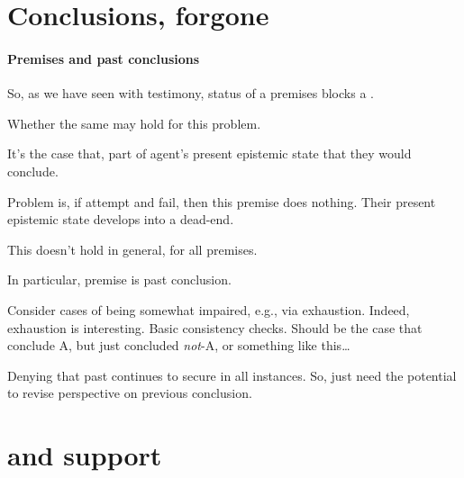 \newpage

\section{Conclusions, forgone}
\label{sec:fc3-1}

\paragraph{Premises and past conclusions}

\begin{note}[Premises]
  So, as we have seen with testimony, status of a premises blocks a \requ{}.

  Whether the same may hold for this problem.

  It's the case that, part of agent's present epistemic state that they would conclude.

  Problem is, if attempt and fail, then this premise does nothing.
  Their present epistemic state develops into a dead-end.
\end{note}

\begin{note}[Note!]
  This doesn't hold in general, for all premises.

  In particular, premise is past conclusion.

  Consider cases of being somewhat impaired, e.g., via exhaustion.
  Indeed, exhaustion is interesting.
  Basic consistency checks.
  Should be the case that conclude A, but just concluded \emph{not}-A, or something like this\dots

  Denying that past continues to secure in all instances.
  So, just need the potential to revise perspective on previous conclusion.
\end{note}

\section{ and support}
\label{cha:fcs:sec:fc3-support}

